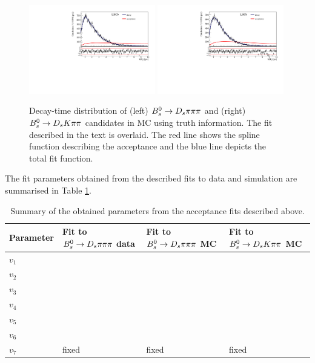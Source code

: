 \begin{figure}[h]
\includegraphics[height=7.cm,width=0.49\textwidth]{figs/SplineAcc_MCFit_combined_trueCT_Norm.pdf}
\includegraphics[height=7.cm,width=0.49\textwidth]{figs/SplineAcc_MCFit_combined_trueCT_Sig.pdf}
\caption{Decay-time distribution of (left) ${{B}^0_{s}}\rightarrow{\ensuremath{{D}_{s}}}{\ensuremath{\pi}}{\ensuremath{\pi}}{\ensuremath{\pi}}$ and (right) ${{B}^0_{s}}\rightarrow{\ensuremath{{D}_{s}}}{\ensuremath{K}}{\ensuremath{\pi}}{\ensuremath{\pi}}$ candidates in MC using truth information. The fit described in the text is overlaid.
The red line shows the spline function describing the acceptance and the blue line depicts the total fit function.}
\label{fig:AccFit_MC}
\end{figure}

The fit parameters obtained from the described fits to data and simulation are summarised in Table \ref{table: Splines}.



\begin{table}[h]
\centering
 \begin{tabular}{l l l l}
Parameter & Fit to ${{B}^0_{s}}\rightarrow{\ensuremath{{D}_{s}}}{\ensuremath{\pi}}{\ensuremath{\pi}}{\ensuremath{\pi}}$ data & Fit to ${{B}^0_{s}}\rightarrow{\ensuremath{{D}_{s}}}{\ensuremath{\pi}}{\ensuremath{\pi}}{\ensuremath{\pi}}$ MC & Fit to ${{B}^0_{s}}\rightarrow{\ensuremath{{D}_{s}}}{\ensuremath{K}}{\ensuremath{\pi}}{\ensuremath{\pi}}$ MC \\
\hline
$v_{1}$ & & & \\
$v_{2}$ & & & \\
$v_{3}$ & & & \\
$v_{4}$ & & & \\
$v_{5}$ & & & \\
$v_{6}$ & & & \\
$v_{7}$ & fixed & fixed & fixed\\
\end{tabular}
\caption{Summary of the obtained parameters from the acceptance fits described above.}
\label{table: Splines}
\end{table}








